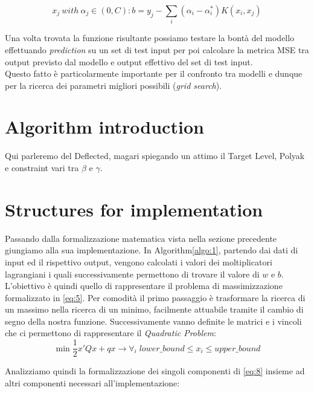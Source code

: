 \documentclass[12pt]{article}
\begin{document}
	\begin{equation}\label{eq:7}
		x_j \  with\  \alpha_j \in(0,C): b = y_j - \sum_i(\alpha_i - \alpha_i^*)K(x_i,x_j)
	\end{equation}

	Una volta trovata la funzione risultante possiamo testare la bontà del modello effettuando \textit{prediction} su un set di test input per poi calcolare la metrica MSE tra output previsto dal modello e output effettivo del set di test input.\\
Questo fatto è particolarmente importante per il confronto tra modelli e dunque per la ricerca dei parametri migliori possibili (\textit{grid search}).

	\section{Algorithm introduction}
	Qui parleremo del Deflected, magari spiegando un attimo il Target Level, Polyak e constraint vari tra $\beta$ e $\gamma$.

	\section{Structures for implementation}
	Passando dalla formalizzazione matematica vista nella sezione precedente giungiamo alla sua implementazione. In Algorithm\ref{algo:1}, partendo dai dati di input ed il rispettivo output, vengono calcolati i valori dei moltiplicatori lagrangiani i quali successivamente permettono di trovare il valore di $w$ e $b$.
L’obiettivo è quindi quello di rappresentare il problema di massimizzazione formalizzato in \eqref{eq:5}. Per comodità il primo passaggio è trasformare la ricerca di un massimo nella ricerca di un minimo, facilmente attuabile tramite il cambio di segno della nostra funzione. Successivamente vanno definite le matrici e i vincoli che ci permettono di rappresentare il \textit{Quadratic Problem}:\\
	\begin{equation}\label{eq:8}
		\min \frac{1}{2}x'Qx + qx \longrightarrow \forall_i\; lower\_bound\leq x_i\leq upper\_bound
	\end{equation}

	Analizziamo quindi la formalizzazione dei singoli componenti di \eqref{eq:8} insieme ad altri componenti necessari all'implementazione:
	
\end{document}
